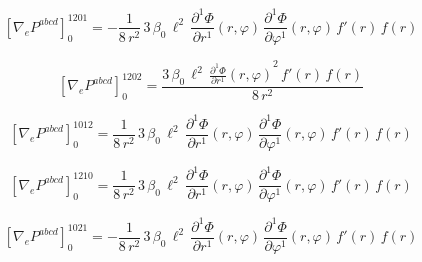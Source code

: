 \documentclass[11pt]{article}
\begin{document}
\begin{dmath*}[breakdepth={5}]
\left[\nabla_e P^{abcd}\right]_{0}^{1201} = -\frac{1}{8\,{r}^{2}}\,3\,\beta_{0}\,{\ell}^{2}\,\frac{\partial^{1} \Phi}{\partial r^{1}}\!\left(r, \varphi\right)\,\frac{\partial^{1} \Phi}{\partial \varphi^{1}}\!\left(r, \varphi\right)\,f'\!\left(r\right)\,f\!\left(r\right)
\end{dmath*}
\par\smallskip
\begin{dmath*}[breakdepth={5}]
\left[\nabla_e P^{abcd}\right]_{0}^{1202} = \frac{3\,\beta_{0}\,{\ell}^{2}\,{\frac{\partial^{1} \Phi}{\partial r^{1}}\!\left(r, \varphi\right)}^{2}\,f'\!\left(r\right)\,f\!\left(r\right)}{8\,{r}^{2}}
\end{dmath*}
\par\smallskip
\begin{dmath*}[breakdepth={5}]
\left[\nabla_e P^{abcd}\right]_{0}^{1012} = \frac{1}{8\,{r}^{2}}\,3\,\beta_{0}\,{\ell}^{2}\,\frac{\partial^{1} \Phi}{\partial r^{1}}\!\left(r, \varphi\right)\,\frac{\partial^{1} \Phi}{\partial \varphi^{1}}\!\left(r, \varphi\right)\,f'\!\left(r\right)\,f\!\left(r\right)
\end{dmath*}
\par\smallskip
\begin{dmath*}[breakdepth={5}]
\left[\nabla_e P^{abcd}\right]_{0}^{1210} = \frac{1}{8\,{r}^{2}}\,3\,\beta_{0}\,{\ell}^{2}\,\frac{\partial^{1} \Phi}{\partial r^{1}}\!\left(r, \varphi\right)\,\frac{\partial^{1} \Phi}{\partial \varphi^{1}}\!\left(r, \varphi\right)\,f'\!\left(r\right)\,f\!\left(r\right)
\end{dmath*}
\par\smallskip
\begin{dmath*}[breakdepth={5}]
\left[\nabla_e P^{abcd}\right]_{0}^{1021} = -\frac{1}{8\,{r}^{2}}\,3\,\beta_{0}\,{\ell}^{2}\,\frac{\partial^{1} \Phi}{\partial r^{1}}\!\left(r, \varphi\right)\,\frac{\partial^{1} \Phi}{\partial \varphi^{1}}\!\left(r, \varphi\right)\,f'\!\left(r\right)\,f\!\left(r\right)
\end{dmath*}
\end{document}
